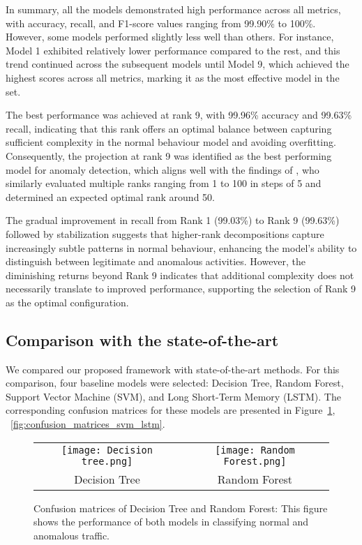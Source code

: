 \documentclass[preprint,12pt,authoryear]{elsarticle}
\begin{document}
In summary, all the models demonstrated high performance across all metrics, with accuracy, recall, and F1-score values ranging from 99.90\% to 100\%. However, some models performed slightly less well than others. For instance, Model 1 exhibited relatively lower performance compared to the rest, and this trend continued across the subsequent models until Model 9, which achieved the highest scores across all metrics, marking it as the most effective model in the set.  

The best performance was achieved at rank 9, with 99.96\% accuracy and 99.63\% recall, indicating that this rank offers an optimal balance between capturing sufficient complexity in the normal behaviour model and avoiding overfitting. Consequently, the projection at rank 9 was identified as the best performing model for anomaly detection, which aligns well with the findings of \cite{eren2023general}, who similarly evaluated multiple ranks ranging from 1 to 100 in steps of 5 and determined an expected optimal rank around 50. 

 The gradual improvement in recall from Rank 1 (99.03\%) to Rank 9 (99.63\%) followed by stabilization suggests that higher-rank decompositions capture increasingly subtle patterns in normal behaviour, enhancing the model's ability to distinguish between legitimate and anomalous activities. However, the diminishing returns beyond Rank 9 indicates that additional complexity does not necessarily translate to improved performance, supporting the selection of Rank 9 as the optimal configuration.   

\subsection{Comparison with the state-of-the-art}

We compared our proposed framework with state-of-the-art methods. For this comparison, four baseline models were selected: Decision Tree, Random Forest, Support Vector Machine (SVM), and Long Short-Term Memory (LSTM). The corresponding confusion matrices for these models are presented in Figure~\ref{fig:confusion_matrices_tree_forest}, ~\ref{fig:confusion_matrices_svm_lstm}.

\begin{figure}[H]
    \centering
    \begin{tabular}{cc}
        \texttt{[image: Decision tree.png]} &
        \texttt{[image: Random Forest.png]} \\
        \small Decision Tree & \small Random Forest
    \end{tabular}
    \caption{Confusion matrices of Decision Tree and Random Forest:
This figure shows the performance of both models in classifying normal and anomalous traffic.}
    \label{fig:confusion_matrices_tree_forest}
\end{figure}
\end{document}
